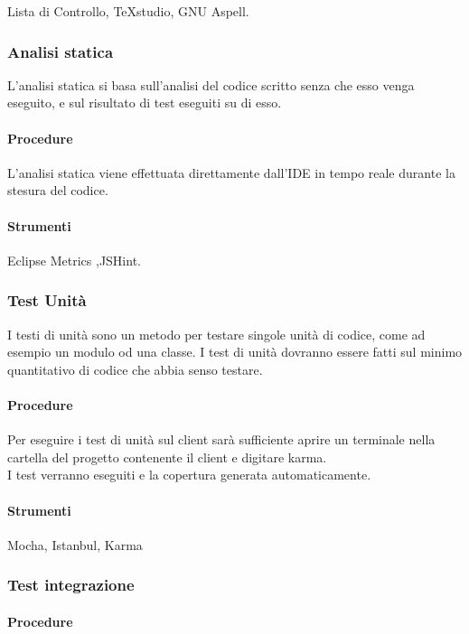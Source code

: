 Lista di Controllo, TeXstudio, GNU Aspell.


\subsubsection{Analisi statica}
L'analisi statica si basa sull'analisi del codice scritto senza che esso venga eseguito, e sul risultato di test eseguiti su di esso.

\paragraph{Procedure}
L'analisi statica viene effettuata direttamente dall'IDE in tempo reale durante la stesura del codice.
\paragraph{Strumenti}
Eclipse Metrics ,JSHint.



\subsubsection{Test Unità}
I testi di unità sono un metodo per testare singole unità di codice, come ad esempio un modulo od una classe. I test di unità dovranno essere fatti sul minimo quantitativo di codice che abbia senso testare.

\paragraph{Procedure}
Per eseguire i test di unità sul client sarà sufficiente aprire un terminale nella cartella del progetto contenente il client e digitare karma.\\
I test verranno eseguiti e la copertura generata automaticamente.
\paragraph{Strumenti}
Mocha, Istanbul, Karma

\subsubsection{Test integrazione}



\paragraph{Procedure}

